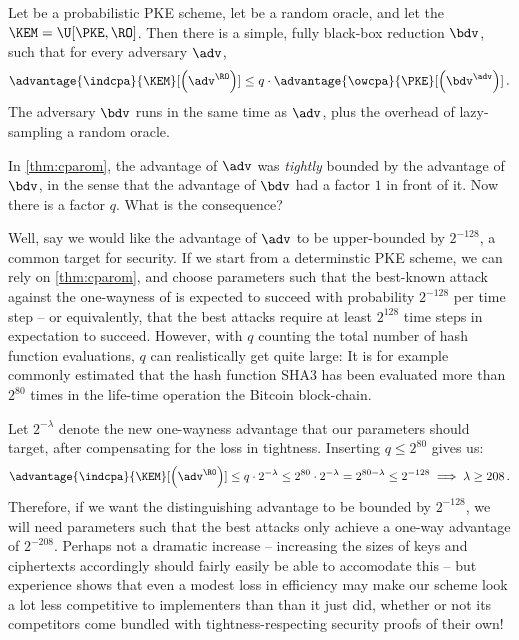   \begin{theorem}
    \label{thm:cparom-guess}
    Let \PKE be a probabilistic PKE scheme, let \RO be a random oracle, 
    and let the $\KEM = \U[\PKE, \RO]$.
    Then there is a simple, fully black-box reduction $\bdv$, such that for
    every adversary $\adv$,
    \[
      \advantage{\indcpa}{\KEM}[\left(\adv^{\RO}\right)] 
        \leq q \cdot \advantage{\owcpa}{\PKE}[\left(\bdv^{\adv}\right)]\, .
    \]
    The adversary $\bdv$ runs in the same time as $\adv$, plus the %
    overhead of lazy-sampling a random oracle.
  \end{theorem}

  In \cref{thm:cparom}, the advantage of $\adv$ was \emph{tightly} bounded by
    the advantage of $\bdv$, in the sense that the advantage of $\bdv$ had a
    factor $1$ in front of it. Now there is a factor $q$. What is the
    consequence?

  Well, say we would like the advantage of $\adv$ to be upper-bounded by
    $2^{-128}$, a common target for security. If we start from a determinstic
    PKE scheme, we can rely on \cref{thm:cparom}, and choose parameters such
    that the best-known attack against the one-wayness of \dPKE is expected
    to succeed with probability $2^{-128}$ per time step -- or equivalently,
    that the best attacks require at least $2^{128}$ time steps in expectation
    to succeed. However, with $q$ counting the total number of hash function
    evaluations, $q$ can realistically get quite large: It is for example commonly
    estimated that the hash function SHA3 has been evaluated more than
    $2^{80}$ times in the life-time operation the Bitcoin block-chain. 

  Let $2^{-\lambda}$ denote the new one-wayness advantage that our parameters
    should target, after compensating for the loss in tightness. Inserting $q
    \leq 2^{80}$ gives us:
    \[
      \advantage{\indcpa}{\KEM}[\left(\adv^{\RO}\right)] 
        \leq q \cdot 2^{-\lambda} \leq 2^{80} \cdot 2^{-\lambda} = 2^{80 - \lambda} \leq 2^{-128}
        \implies \lambda \geq 208\, .
    \]
    Therefore, if we want the distinguishing advantage to be bounded by
      $2^{-128}$, we will need parameters such that the best attacks only
      achieve a one-way advantage of $2^{-208}$. 
      Perhaps not a dramatic increase --
      increasing the sizes of keys and ciphertexts accordingly should fairly
      easily be able to accomodate this -- but experience shows
      that even a modest loss in efficiency may make our scheme look a lot
      less competitive to implementers than than it just did, whether or not
      its competitors come bundled with tightness-respecting security proofs
      of their own!

